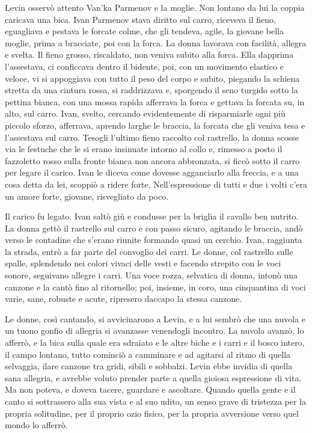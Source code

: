 Levin osservò attento Van'ka Parmenov e la moglie. Non lontano da lui la coppia caricava una bica. Ivan Parmenov stava diritto sul carro, riceveva il fieno, eguagliava e pestava le forcate colme, che gli tendeva, agile, la giovane bella moglie, prima a bracciate, poi con la forca. La donna lavorava con facilità, allegra e svelta. Il fieno grosso, riscaldato, non veniva subito alla forca. Ella dapprima l'assestava, ci conficcava dentro il bidente, poi, con un movimento elastico e veloce, vi si appoggiava con tutto il peso del corpo e subito, piegando la schiena stretta da una cintura rossa, si raddrizzava e, sporgendo il seno turgido sotto la pettina bianca, con una mossa rapida afferrava la forca e gettava la forcata su, in alto, sul carro. Ivan, svelto, cercando evidentemente di risparmiarle ogni più piccolo sforzo, afferrava, aprendo larghe le braccia, la forcata che gli veniva tesa e l'assestava sul carro. Tesogli l'ultimo fieno raccolto col rastrello, la donna scosse via le festuche che le si erano insinuate intorno al collo e, rimesso a posto il fazzoletto rosso sulla fronte bianca non ancora abbronzata, si ficcò sotto il carro per legare il carico. Ivan le diceva come dovesse agganciarlo alla freccia, e a una cosa detta da lei, scoppiò a ridere forte. Nell'espressione di tutti e due i volti c'era un amore forte, giovane, risvegliato da poco. 
\enlargethispage*{1\baselineskip}

\label{xii-2} 

Il carico fu legato. Ivan saltò giù e condusse per la briglia il cavallo ben nutrito. La donna gettò il rastrello sul carro e con passo sicuro, agitando le braccia, andò verso le contadine che s'erano riunite formando quasi un cerchio. Ivan, raggiunta la strada, entrò a far parte del convoglio dei carri. Le donne, col rastrello sulle spalle, splendendo nei colori vivaci delle vesti e facendo strepito con le voci sonore, seguivano allegre i carri. Una voce rozza, selvatica di donna, intonò una canzone e la cantò fino al ritornello; poi, insieme, in coro, una cinquantina di voci varie, sane, robuste e acute, ripresero daccapo la stessa canzone. 

Le donne, così cantando, si avvicinarono a Levin, e a lui sembrò che una nuvola e un tuono gonfio di allegria si avanzasse venendogli incontro. La nuvola avanzò, lo afferrò, e la bica sulla quale era sdraiato e le altre biche e i carri e il bosco intero, il campo lontano, tutto cominciò a camminare e ad agitarsi al ritmo di quella selvaggia, ilare canzone tra gridi, sibili e sobbalzi. Levin ebbe invidia di quella sana allegria, e avrebbe voluto prender parte a quella gioiosa espressione di vita. Ma non poteva, e doveva tacere, guardare e ascoltare. Quando quella gente e il canto si sottrassero alla sua vista e al suo udito, un senso grave di tristezza per la propria solitudine, per il proprio ozio fisico, per la propria avversione verso quel mondo lo afferrò. 

